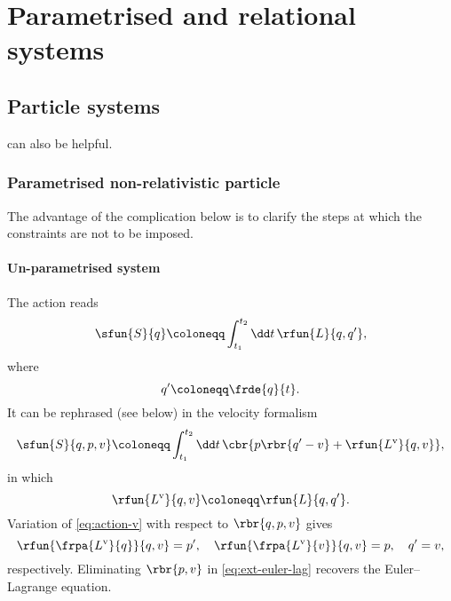\section{Parametrised and relational systems}

\subsection{Particle systems}

\cite{Gitman_1990,Prokhorov_2009,Rothe_2010} can also be helpful.

\subsubsection{Parametrised non-relativistic particle}

The advantage of the complication below is to clarify the steps at which the 
constraints are not to be imposed.

\paragraph{Un-parametrised system}

The action reads
\begin{equation}
\sfun{S}{q} \coloneqq \int_{t_1}^{t_2}\dd t\,\rfun{L}{q, q'},
\label{eq:action-ori}
\end{equation}
where
\begin{equation}
q' \coloneqq \frde{q}{t}.
\end{equation}
It can be rephrased (see below) in the velocity formalism 
\cite[ch.~2]{Gitman_1990}
\begin{equation}
\sfun{S}{q, p, v} \coloneqq \int_{t_1}^{t_2}\dd t\,\cbr{p\rbr{q'-v}+
\rfun{L^\text{v}}{q, v}},
\label{eq:action-v}
\end{equation}
in which
\begin{equation}
\rfun{L^\text{v}}{q, v} \coloneqq \rfun{L}{q, q'}.
\end{equation}
Variation of \cref{eq:action-v} with respect to $\rbr{q, p, v}$ gives
\begin{equation}
\rfun{\frpa{L^\text{v}}{q}}{q, v} = p',\quad
\rfun{\frpa{L^\text{v}}{v}}{q, v} = p,\quad
q' = v,
\label{eq:ext-euler-lag}
\end{equation}
respectively. Eliminating $\rbr{p, v}$ in \cref{eq:ext-euler-lag} recovers the 
Euler--Lagrange equation.


